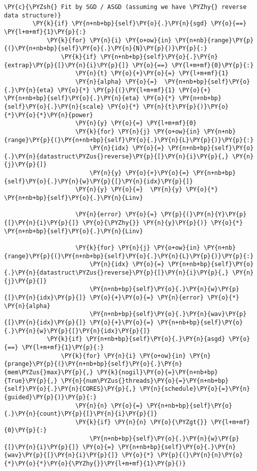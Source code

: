 \begin{Verbatim}[commandchars=\\\{\}]
        \PY{c}{\PYZsh{} Fit by SGD / ASGD (assuming we have \PYZhy{} reverse data structure)}
        \PY{k}{if} \PY{n+nb+bp}{self}\PY{o}{.}\PY{n}{sgd} \PY{o}{==} \PY{l+m+mf}{1}\PY{p}{:}
            \PY{k}{for} \PY{n}{i} \PY{o+ow}{in} \PY{n+nb}{range}\PY{p}{(}\PY{n+nb+bp}{self}\PY{o}{.}\PY{n}{N}\PY{p}{)}\PY{p}{:}
                \PY{k}{if} \PY{n+nb+bp}{self}\PY{o}{.}\PY{n}{extrap}\PY{p}{[}\PY{n}{i}\PY{p}{]} \PY{o}{==} \PY{l+m+mf}{0}\PY{p}{:}
                    \PY{n}{t} \PY{o}{+}\PY{o}{=} \PY{l+m+mf}{1}
                    \PY{n}{alpha} \PY{o}{=}  \PY{n+nb+bp}{self}\PY{o}{.}\PY{n}{eta} \PY{o}{*} \PY{p}{(}\PY{l+m+mf}{1} \PY{o}{+}  \PY{n+nb+bp}{self}\PY{o}{.}\PY{n}{eta} \PY{o}{*} \PY{n+nb+bp}{self}\PY{o}{.}\PY{n}{scale} \PY{o}{*} \PY{n}{t}\PY{p}{)}\PY{o}{*}\PY{o}{*}\PY{n}{power}
                    \PY{n}{y} \PY{o}{=} \PY{l+m+mf}{0}
                    \PY{k}{for} \PY{n}{j} \PY{o+ow}{in} \PY{n+nb}{range}\PY{p}{(}\PY{n+nb+bp}{self}\PY{o}{.}\PY{n}{L}\PY{p}{)}\PY{p}{:} 
                        \PY{n}{idx} \PY{o}{=} \PY{n+nb+bp}{self}\PY{o}{.}\PY{n}{datastruct\PYZus{}reverse}\PY{p}{[}\PY{n}{i}\PY{p}{,} \PY{n}{j}\PY{p}{]}
                        \PY{n}{y} \PY{o}{+}\PY{o}{=} \PY{n+nb+bp}{self}\PY{o}{.}\PY{n}{w}\PY{p}{[}\PY{n}{idx}\PY{p}{]}
                    \PY{n}{y} \PY{o}{=}  \PY{n}{y} \PY{o}{*} \PY{n+nb+bp}{self}\PY{o}{.}\PY{n}{Linv}

                    \PY{n}{error} \PY{o}{=} \PY{p}{(}\PY{n}{Y}\PY{p}{[}\PY{n}{i}\PY{p}{]} \PY{o}{\PYZhy{}} \PY{n}{y}\PY{p}{)} \PY{o}{*} \PY{n+nb+bp}{self}\PY{o}{.}\PY{n}{Linv}

                    \PY{k}{for} \PY{n}{j} \PY{o+ow}{in} \PY{n+nb}{range}\PY{p}{(}\PY{n+nb+bp}{self}\PY{o}{.}\PY{n}{L}\PY{p}{)}\PY{p}{:}
                        \PY{n}{idx} \PY{o}{=} \PY{n+nb+bp}{self}\PY{o}{.}\PY{n}{datastruct\PYZus{}reverse}\PY{p}{[}\PY{n}{i}\PY{p}{,} \PY{n}{j}\PY{p}{]}
                        \PY{n+nb+bp}{self}\PY{o}{.}\PY{n}{w}\PY{p}{[}\PY{n}{idx}\PY{p}{]} \PY{o}{+}\PY{o}{=} \PY{n}{error} \PY{o}{*} \PY{n}{alpha}
                        \PY{n+nb+bp}{self}\PY{o}{.}\PY{n}{wav}\PY{p}{[}\PY{n}{idx}\PY{p}{]} \PY{o}{+}\PY{o}{=} \PY{n+nb+bp}{self}\PY{o}{.}\PY{n}{w}\PY{p}{[}\PY{n}{idx}\PY{p}{]}
            \PY{k}{if} \PY{n+nb+bp}{self}\PY{o}{.}\PY{n}{asgd} \PY{o}{==} \PY{l+m+mf}{1}\PY{p}{:}
                \PY{k}{for} \PY{n}{i} \PY{o+ow}{in} \PY{n}{prange}\PY{p}{(}\PY{n+nb+bp}{self}\PY{o}{.}\PY{n}{mem\PYZus{}max}\PY{p}{,} \PY{k}{nogil}\PY{o}{=}\PY{n+nb+bp}{True}\PY{p}{,} \PY{n}{num\PYZus{}threads}\PY{o}{=}\PY{n+nb+bp}{self}\PY{o}{.}\PY{n}{CORES}\PY{p}{,} \PY{n}{schedule}\PY{o}{=}\PY{n}{guided}\PY{p}{)}\PY{p}{:}
                    \PY{n}{n} \PY{o}{=} \PY{n+nb+bp}{self}\PY{o}{.}\PY{n}{count}\PY{p}{[}\PY{n}{i}\PY{p}{]}
                    \PY{k}{if} \PY{n}{n} \PY{o}{\PYZgt{}} \PY{l+m+mf}{0}\PY{p}{:}
                        \PY{n+nb+bp}{self}\PY{o}{.}\PY{n}{w}\PY{p}{[}\PY{n}{i}\PY{p}{]} \PY{o}{=} \PY{n+nb+bp}{self}\PY{o}{.}\PY{n}{wav}\PY{p}{[}\PY{n}{i}\PY{p}{]} \PY{o}{*} \PY{p}{(}\PY{n}{n}\PY{o}{*}\PY{o}{*}\PY{o}{\PYZhy{}}\PY{l+m+mf}{1}\PY{p}{)}


\end{Verbatim}
